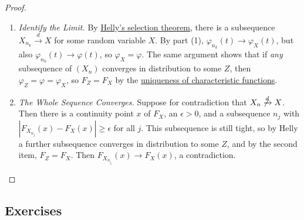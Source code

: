 \begin{proof}
\begin{enumerate}
		\item \textit{Identify the Limit.} By \hyperref[thm:helly-selection-theorem]{Helly's selection theorem}, there is a subsequence $X_{n_k} \xrightarrow{d} X$ for some random variable $X$. By part (1), $\varphi_{n_k} (t) \to \varphi_X (t)$, but also $\varphi_{n_k} (t) \to \varphi(t)$, so $\varphi_X = \varphi$. The same argument shows that if \textit{any} subsequence of $(X_n)$ converges in distribution to some $Z$, then $\varphi_Z = \varphi = \varphi_X$, so $F_Z = F_X$ by the \hyperref[thm:inversion-theorem-cf]{uniqueness of characteristic functions}. 

		\item \textit{The Whole Sequence Converges.} Suppose for contradiction that $X_n \not\xrightarrow{d} X$. Then there is a continuity point $x$ of $F_X$, an $\epsilon > 0$, and a subsequence $n_j$ with $|F_{X_{n_j}} (x) - F_X (x)| \geq \epsilon$ for all $j$. This subsequence is still tight, so by Helly a further subsequence converges in distribution to some $Z$, and by the second item, $F_Z = F_X$. Then $F_{X_{n_{j_l}}} (x) \to F_X (x)$, a contradiction. 
		\end{enumerate}
	\end{proof}

\subsection{Exercises} 

